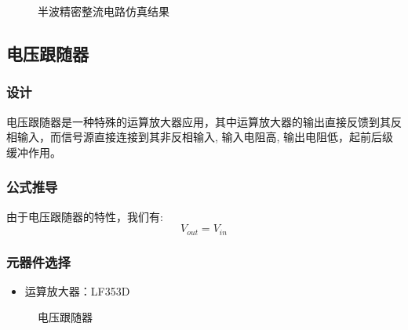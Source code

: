 \documentclass[UTF8,titlepage,a4paper]{ctexart}
\numberwithin{figure}{section}
\begin{document}
\begin{figure}[H]
\centering
 \caption{半波精密整流电路仿真结果}
 \label{}
\end{figure}
\subsection{电压跟随器}

\subsubsection{设计}
电压跟随器是一种特殊的运算放大器应用，其中运算放大器的输出直接反馈到其反相输入，而信号源直接连接到其非反相输入, 输入电阻高, 输出电阻低，起前后级缓冲作用。

\subsubsection{公式推导}
由于电压跟随器的特性，我们有:
\[ V_{out} = V_{in} \]

\subsubsection{元器件选择}
\begin{itemize}
    \item 运算放大器：LF353D
\end{itemize}

\begin{figure}[H]
\centering
 \caption{电压跟随器}
 \label{}
\end{figure}
\end{document}
